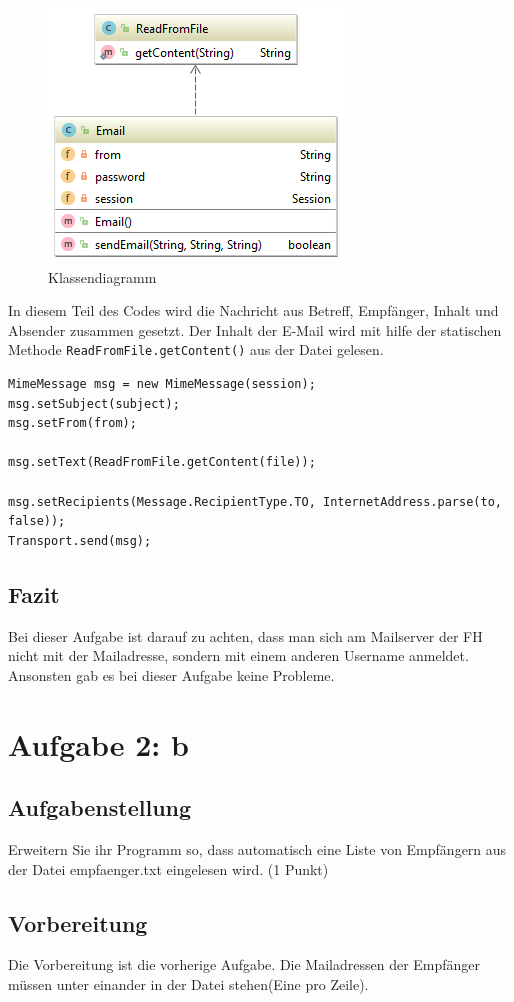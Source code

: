 \begin{figure}[H]
	\centering
	\includegraphics[width=0.4 \linewidth]{images/19}
	\caption{Klassendiagramm}
\end{figure}

\newpage
In diesem Teil des Codes wird die Nachricht aus Betreff, Empfänger, Inhalt und Absender zusammen gesetzt. Der Inhalt der E-Mail wird mit hilfe der statischen Methode \texttt{ReadFromFile.getContent()} aus der Datei gelesen.

\lstset{language=Java}
\begin{lstlisting}
MimeMessage msg = new MimeMessage(session);
msg.setSubject(subject);
msg.setFrom(from);

msg.setText(ReadFromFile.getContent(file));

msg.setRecipients(Message.RecipientType.TO, InternetAddress.parse(to, false));
Transport.send(msg);
\end{lstlisting}

\subsection{Fazit}
Bei dieser Aufgabe ist darauf zu achten, dass man sich am Mailserver der FH nicht mit der Mailadresse, sondern mit einem anderen Username anmeldet. Ansonsten gab es bei dieser Aufgabe keine Probleme.

\section{Aufgabe 2: b}
\subsection{Aufgabenstellung}
Erweitern Sie ihr Programm so, dass automatisch eine Liste von Empfängern aus der Datei
empfaenger.txt eingelesen wird. (1 Punkt)

\subsection{Vorbereitung}
Die Vorbereitung ist die vorherige Aufgabe. Die Mailadressen der Empfänger müssen unter einander in der Datei stehen(Eine pro Zeile).

